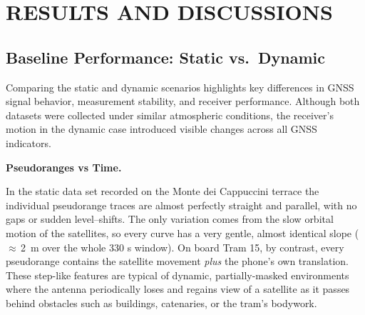 
\section{RESULTS AND DISCUSSIONS} \label{sec:results}

    \subsection{Baseline Performance: Static vs.\ Dynamic}

        Comparing the static and dynamic scenarios highlights key differences in GNSS signal behavior, measurement stability, and receiver performance. 
        Although both datasets were collected under similar atmospheric conditions, the receiver's motion in the dynamic case introduced visible changes across all GNSS indicators.
    
        \vspace{0.5em}
        \textbf{Pseudoranges vs Time.} 

        In the static data set recorded on the Monte dei Cappuccini terrace the individual
        pseudorange traces are almost perfectly straight and parallel, with no gaps or sudden
        level–shifts.  The only variation comes from the slow orbital motion of the satellites,
        so every curve has a very gentle, almost identical slope
        ($\approx$\,\SI{2}{\metre} over the whole 330 s window).
        On board Tram 15, by contrast, every pseudorange contains the satellite movement
        \emph{plus} the phone’s own translation. These step-like features
        are typical of dynamic, partially-masked environments where the antenna periodically
        loses and regains view of a satellite as it passes behind obstacles such as buildings,
        catenaries, or the tram’s bodywork.

